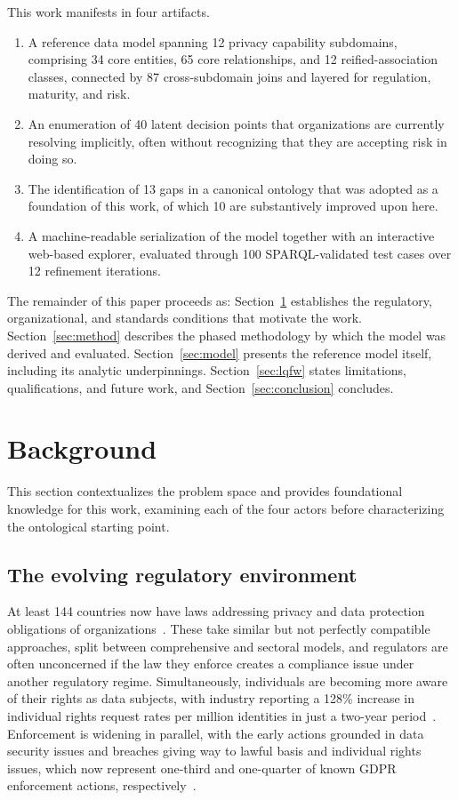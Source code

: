 \documentclass[10pt,letterpaper,twocolumn,twoside]{rho-class/rho}
\begin{document}
This work manifests in four artifacts. 
\begin{enumerate}
    \item A reference data model spanning 12 privacy capability subdomains, comprising 34 core entities, 65 core relationships, and 12 reified-association classes, connected by 87 cross-subdomain joins and layered for regulation, maturity, and risk.
    \item An enumeration of 40 latent decision points that organizations are currently resolving implicitly, often without recognizing that they are accepting risk in doing so. 
    \item The identification of 13 gaps in a canonical ontology that was adopted as a foundation of this work, of which 10 are substantively improved upon here.
    \item A machine-readable serialization of the model together with an interactive web-based explorer, evaluated through 100 SPARQL-validated test cases over 12 refinement iterations.
\end{enumerate}

The remainder of this paper proceeds as: Section~\ref{sec:background} establishes the regulatory, organizational, and standards conditions that motivate the work. Section~\ref{sec:method} describes the phased methodology by which the model was derived and evaluated. Section~\ref{sec:model} presents the reference model itself, including its analytic underpinnings. 
Section~\ref{sec:lqfw} states limitations, qualifications, and future work, and Section~\ref{sec:conclusion} concludes.

\section{Background}\label{sec:background}

This section contextualizes the problem space and provides foundational knowledge for this work, examining each of the four actors before characterizing the ontological starting point.

\subsection{The evolving regulatory environment}\label{sec:regenv}

At least 144 countries now have laws addressing privacy and data protection obligations of organizations~\cite{IAPP144}. These take similar but not perfectly compatible approaches, split between comprehensive and sectoral models, and regulators are often unconcerned if the law they enforce creates a compliance issue under another regulatory regime. Simultaneously, individuals are becoming more aware of their rights as data subjects, with industry reporting a 128\% increase in individual rights request rates per million identities in just a two-year period~\cite{Cisco2026}. Enforcement is widening in parallel, with the early actions grounded in data security issues and breaches giving way to lawful basis and individual rights issues, which now represent one-third and one-quarter of known GDPR enforcement actions, respectively~\cite{CMS2025Numbers}.
\end{document}
